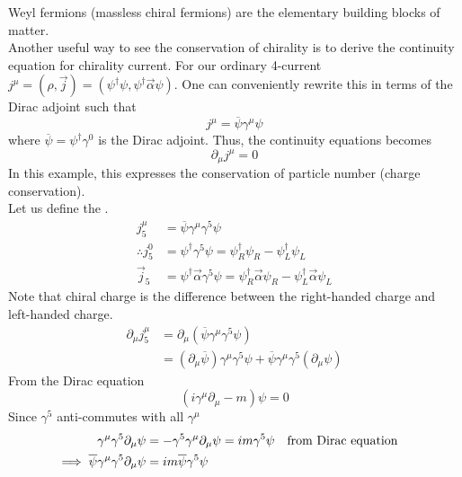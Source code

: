 \documentclass[12pt,a4paper,titlepage]{article}
\newcommand{\ul}[1]{\underline{\smash{#1}}} %
\begin{document}
Weyl fermions (massless chiral fermions) are the elementary building blocks of matter.\\

Another useful way to see the conservation of chirality is to derive the continuity equation for chirality current. For our ordinary 4-current $j^{\mu}=(\rho,\vec{j})=(\psi^{\dagger}\psi,\psi^{\dagger}\vec{\alpha}\psi)$. One can conveniently rewrite this in terms of the Dirac adjoint such that
\begin{equation}
j^{\mu}=\overline{\psi}\gamma^{\mu}\psi
\end{equation}
where $\overline{\psi}=\psi^{\dagger}\gamma^{0}$ is the Dirac adjoint. Thus, the continuity equations becomes
\begin{equation}
\partial_{\mu}j^{\mu}=0
\end{equation}
In this example, this expresses the conservation of particle number (charge conservation).\\

Let us define the \ul{chiral 4-current}.
\begin{equation}
\begin{aligned}
j_{5}^{\mu}&=\overline{\psi}\gamma^{\mu}\gamma^{5}\psi\\
\therefore j_{5}^{0}&=\psi^{\dagger}\gamma^{5}\psi=\psi_{R}^{\dagger}\psi_{R}-\psi_{L}^{\dagger}\psi_{L}\\
\vec{j}_{5}&=\psi^{\dagger}\vec{\alpha}\gamma^{5}\psi=\psi_{R}^{\dagger}\vec{\alpha}\psi_{R}-\psi_{L}^{\dagger}\vec{\alpha}\psi_{L}
\end{aligned}
\end{equation}
Note that chiral charge is the difference between the right-handed charge and left-handed charge.
\begin{equation}
\begin{aligned}
\partial_{\mu}j_{5}^{\mu}&=\partial_{\mu}(\overline{\psi}\gamma^{\mu}\gamma^{5}\psi)\\
&=(\partial_{\mu}\overline{\psi})\gamma^{\mu}\gamma^{5}\psi+\overline{\psi}\gamma^{\mu}\gamma^{5}(\partial_{\mu}\psi)
\end{aligned}
\end{equation}
From the Dirac equation
\begin{equation}
 (i\gamma^{\mu}\partial_{\mu}-m)\psi=0
\end{equation}
Since $\gamma^{5}$ anti-commutes with all $\gamma^{\mu}$
\begin{equation}
\begin{aligned}
\gamma^{\mu}\gamma^{5}\partial_{\mu}\psi&=-\gamma^{5}\gamma^{\mu}\partial_{\mu}\psi=im\gamma^{5}\psi\qq{from Dirac equation}\\
\implies \overline{\psi}\gamma^{\mu}\gamma^{5}\partial_{\mu}\psi&=im\overline{\psi}\gamma^{5}\psi
\end{aligned}
\end{equation}
\end{document}
